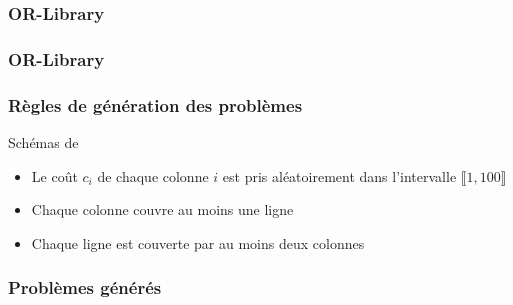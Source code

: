 \documentclass[aspectratio=169,11pt]{beamer}
\begin{document}
	\begin{frame}
		\frametitle{OR-Library}
		\centering\resizebox{0.85\linewidth}{!}{}
	\end{frame}
	\begin{frame}
		\frametitle{OR-Library}
		\hfill%
		\begin{minipage}{0.24\linewidth}
			\resizebox{\linewidth}{!}{}%
		\end{minipage}
		\hfill%
		\begin{minipage}{0.24\linewidth}
			\resizebox{\linewidth}{!}{}%
		\end{minipage}
		\hfill\hspace{0pt}
	\end{frame}
	\begin{frame}
		\frametitle{Règles de génération des problèmes}
		\begin{block}{Schémas de \citeauthor{Balas1980}}
			\begin{itemize}
				\item Le coût \(c_i\) de chaque colonne \(i\) est pris aléatoirement dans l'intervalle \(\llbracket1,100\rrbracket\)
				\item Chaque colonne couvre au moins une ligne
				\item Chaque ligne est couverte par au moins deux colonnes
			\end{itemize}
		\end{block}
	\end{frame}
	\begin{frame}
		\frametitle{Problèmes générés}
		\hfill%
		\begin{minipage}{0.21\linewidth}
			\resizebox{\linewidth}{!}{}%
		\end{minipage}
		\hfill%
		\begin{minipage}{0.21\linewidth}
			\resizebox{\linewidth}{!}{}%
		\end{minipage}
		\hfill%
		\begin{minipage}{0.21\linewidth}
			\resizebox{\linewidth}{!}{}%
		\end{minipage}
		\hfill%
		\begin{minipage}{0.21\linewidth}
			\resizebox{\linewidth}{!}{}%
		\end{minipage}
		\hfill\hspace{0pt}
	\end{frame}
\end{document}
